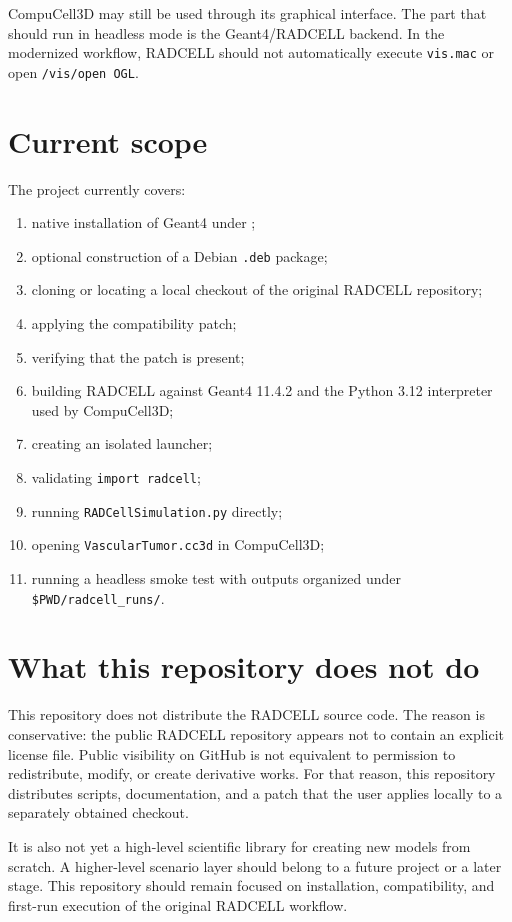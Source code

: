 \documentclass[11pt,a4paper,twoside,pdftex]{refrep}
\begin{document}
CompuCell3D may still be used through its graphical interface. The part that should run in headless mode is the Geant4/RADCELL backend. In the modernized workflow, RADCELL should not automatically execute \texttt{vis.mac} or open \texttt{/vis/open OGL}.

\section{Current scope}

The project currently covers:

\begin{enumerate}
  \item native installation of Geant4 under ;
  \item optional construction of a Debian \texttt{.deb} package;
  \item cloning or locating a local checkout of the original RADCELL repository;
  \item applying the compatibility patch;
  \item verifying that the patch is present;
  \item building RADCELL against Geant4 11.4.2 and the Python 3.12 interpreter used by CompuCell3D;
  \item creating an isolated launcher;
  \item validating \texttt{import radcell};
  \item running \texttt{RADCellSimulation.py} directly;
  \item opening \texttt{VascularTumor.cc3d} in CompuCell3D;
  \item running a headless smoke test with outputs organized under \texttt{\$PWD/radcell\_runs/}.
\end{enumerate}

\section{What this repository does not do}

This repository does not distribute the RADCELL source code. The reason is conservative: the public RADCELL repository appears not to contain an explicit license file. Public visibility on GitHub is not equivalent to permission to redistribute, modify, or create derivative works. For that reason, this repository distributes scripts, documentation, and a patch that the user applies locally to a separately obtained checkout.

It is also not yet a high-level scientific library for creating new models from scratch. A higher-level scenario layer should belong to a future project or a later stage. This repository should remain focused on installation, compatibility, and first-run execution of the original RADCELL workflow.
\end{document}
